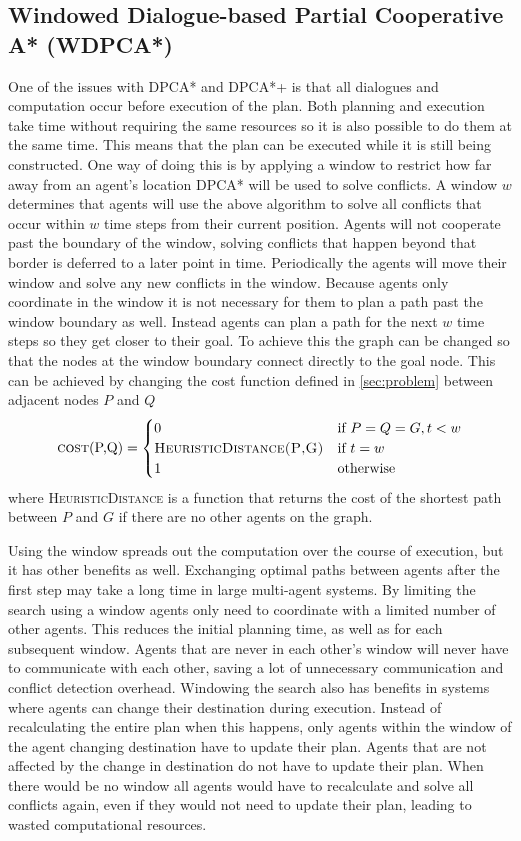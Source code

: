 \subsection{Windowed Dialogue-based Partial Cooperative A* (WDPCA*)}
One of the issues with DPCA* and DPCA*+ is that all dialogues and computation
occur before execution of the plan. Both planning and execution take time
without requiring the same resources so it is also possible to do them at the
same time. This means that the plan can be executed while it is still being
constructed. One way of doing this is by applying a window to restrict how far
away from an agent's location DPCA* will be used to solve conflicts. A
window $w$ determines that agents will use the above algorithm to solve all
conflicts that occur within $w$ time steps from their current position. Agents
will not cooperate past the boundary of the window, solving conflicts that
happen beyond that border is deferred to a later point in time. Periodically
the agents will move their window and solve any new conflicts in the window.
Because agents only coordinate in the window it is not necessary for them to
plan a path past the window boundary as well. Instead agents can plan a path
for the next $w$ time steps so they get closer to their goal. To achieve this
the graph can be changed so that the nodes at the window boundary connect
directly to the goal node. This can be achieved by changing the cost function
defined in \autoref{sec:problem} between adjacent nodes $P$ and $Q$
\cite{silver2005}
\[
\text{\textsc{cost}(P,Q)} =
\begin{cases}
    0 & \text{if } P = Q = G, t < w \\
    \textsc{HeuristicDistance(P,G)} & \text{if } t = w \\
    1 & \text{otherwise}
\end{cases}
\]
where \textsc{HeuristicDistance} is a function that returns the cost of the
shortest path between $P$ and $G$ if there are no other agents on the graph.

Using the window spreads out the computation over the course of execution, but
it has other benefits as well. Exchanging optimal paths between agents after
the first step may take a long time in large multi-agent systems.
By limiting the search using a window agents only need to coordinate with a
limited number of other agents. This reduces
the initial planning time, as well as for each subsequent window. Agents that
are never in each other's window will never have to communicate with each other,
saving a lot of unnecessary communication and conflict detection overhead.
Windowing the search also has benefits in systems where agents can change their
destination during execution. Instead of recalculating the entire plan when
this happens, only agents within the window of the agent changing destination
have to update their plan. Agents that are not affected by the change in
destination do not have to update their plan. When there would be no window all
agents would have to recalculate and solve all conflicts again, even if they
would not need to update their plan, leading to wasted computational resources.

